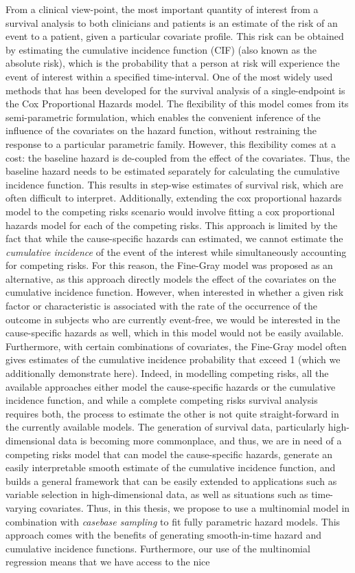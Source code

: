 From a clinical view-point, the most important quantity of interest from a survival analysis to both clinicians and patients is an estimate of the risk of an event to a patient, given a particular covariate profile. This risk can be obtained by estimating the cumulative incidence function (CIF) (also known as the absolute risk), which is the probability that a person at risk will experience the event of interest within a specified time-interval. One of the most widely used methods that has been developed for the survival analysis of a single-endpoint is the Cox Proportional Hazards model. The flexibility of this model comes from its semi-parametric formulation, which enables the convenient inference of the influence of the covariates on the hazard function, without restraining the response to a particular parametric family. However, this flexibility comes at a cost: the baseline hazard is de-coupled from the effect of the covariates. Thus, the baseline hazard needs to be estimated separately for calculating the cumulative incidence function. This results in step-wise estimates of survival risk, which are often difficult to interpret. Additionally, extending the cox proportional hazards model to the competing risks scenario would involve fitting a cox proportional hazards model for each of the competing risks. This approach is limited by the fact that while the cause-specific hazards can estimated, we cannot estimate the \textit{cumulative incidence} of the event of the interest while simultaneously accounting for competing risks. For this reason, the Fine-Gray model was proposed as an alternative, as this approach directly models the effect of the covariates on the cumulative incidence function. However, when interested in whether a given risk factor or characteristic is associated with the rate of the occurrence of the outcome in subjects who are currently event‐free, we would be interested in the cause-specific hazards as well, which in this model would not be easily available. Furthermore, with certain combinations of covariates, the Fine-Gray model often gives estimates of the cumulative incidence probability that exceed 1 (which we additionally demonstrate here). Indeed, in modelling competing risks, all the available approaches either model the cause-specific hazards or the cumulative incidence function, and while a complete competing risks survival analysis requires both, the process to estimate the other is not quite straight-forward in the currently available models. The generation of survival data, particularly high-dimensional data is becoming more commonplace, and thus, we are in need of a competing risks model that can model the cause-specific hazards, generate an easily interpretable smooth estimate of the cumulative incidence function, and builds a general framework that can be easily extended to applications such as variable selection in high-dimensional data, as well as situations such as time-varying covariates. Thus, in this thesis, we propose to use a multinomial model in combination with \textit{casebase sampling} to fit fully parametric hazard models. This approach comes with the benefits of generating smooth-in-time hazard and cumulative incidence functions. Furthermore, our use of the multinomial regression means that we have access to the nice 